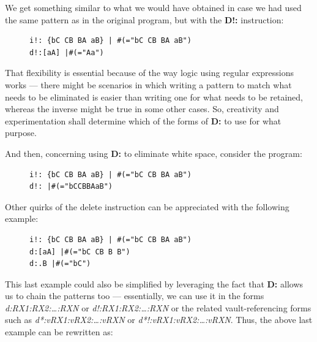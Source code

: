 \documentclass[a4paper, 18pt]{book} %
\begin{document}
We get something similar to what we would have obtained in case we had used the same pattern as in the original program, but with the \textbf{D!:} instruction:


\begin{figure}[H]
 \Large
  \centering
  \begin{tcolorbox}[teaterminalstyle, title=TEA Program: delete all things NOT `a' or `A']
  \begin{lstlisting}[language=TEA]
i!: {bC CB BA aB} | #(="bC CB BA aB")
d!:[aA] |#(="Aa")
   \end{lstlisting}
  \end{tcolorbox}
\end{figure}


That flexibility is essential because of the way logic using regular expressions works --- there might be scenarios in which writing a pattern to match what needs to be eliminated is easier than writing one for what needs to be retained, whereas the inverse might be true in some other cases. So, creativity and experimentation shall determine which of the forms of \textbf{D:} to use for what purpose.

And then, concerning using \textbf{D:} to eliminate white space, consider the program:


\begin{figure}[H]
 \Large
  \centering
  \begin{tcolorbox}[teaterminalstyle, title=TEA Program: delete ALL WHITE-SPACE]
  \begin{lstlisting}[language=TEA]
i!: {bC CB BA aB} | #(="bC CB BA aB")
d!: |#(="bCCBBAaB")
   \end{lstlisting}
  \end{tcolorbox}
\end{figure}


Other quirks of the delete instruction can be appreciated with the following example:



\begin{figure}[H]
 \Large
  \centering
  \begin{tcolorbox}[teaterminalstyle, title=TEA Program: more D:]
  \begin{lstlisting}[language=TEA]
i!: {bC CB BA aB} | #(="bC CB BA aB")
d:[aA] |#(="bC CB B B")
d:.B |#(="bC")
   \end{lstlisting}
  \end{tcolorbox}
\end{figure}

This last example could also be simplified by leveraging the fact that \textbf{D:} allows us to chain the patterns too --- essentially, we can use it in the forms \textit{d:RX1:RX2:…:RXN} or \textit{d!:RX1:RX2:…:RXN} or the related vault-referencing forms such as \textit{d*:vRX1:vRX2:…:vRXN} or 
 \textit{d*!:vRX1:vRX2:…:vRXN}. Thus, the above last example can be rewritten as:
 
\end{document}
